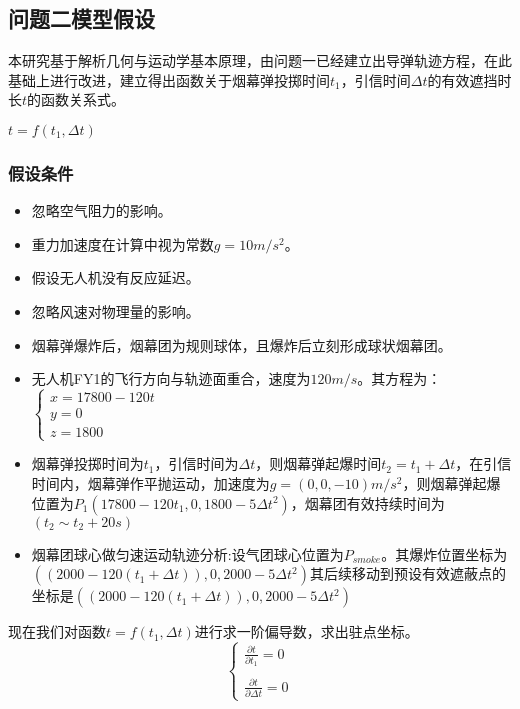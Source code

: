 \documentclass{article}
\begin{document}
\subsection{问题二模型假设}
本研究基于解析几何与运动学基本原理，由问题一已经建立出导弹轨迹方程，在此基础上进行改进，建立得出函数关于烟幕弹投掷时间$t_1$，引信时间$\Delta t$的有效遮挡时长$t$的函数关系式。

$t = f(t_1 , \Delta t)$

\subsubsection{假设条件}
\begin{itemize}
    \item 忽略空气阻力的影响。
    \item 重力加速度在计算中视为常数$g = 10m/s^2$。
    \item 假设无人机没有反应延迟。
    \item 忽略风速对物理量的影响。
    \item 烟幕弹爆炸后，烟幕团为规则球体，且爆炸后立刻形成球状烟幕团。
\end{itemize}

\begin{itemize}
    \item 无人机FY1的飞行方向与轨迹面重合，速度为$120m/s$。其方程为：$\begin{cases}
        x = 17800 - 120t \\
        y = 0 \\
        z = 1800
    \end{cases}$
    \item 烟幕弹投掷时间为$t_1$，引信时间为$\Delta t$，则烟幕弹起爆时间$t_2 = t_1 + \Delta t$，在引信时间内，烟幕弹作平抛运动，加速度为$g = (0,0,-10)$$m/s^2$，则烟幕弹起爆位置为$P_1(17800 - 120t_1,0,1800 - 5\Delta t^2)$，烟幕团有效持续时间为$(t_2 \sim t_2 + 20s)$
    \item 烟幕团球心做匀速运动轨迹分析:设气团球心位置为$P_{smoke}$。其爆炸位置坐标为$((2000-120(t_1 + \Delta t)),0,2000-5 \Delta t^2)$其后续移动到预设有效遮蔽点的坐标是$((2000-120(t_1 + \Delta t)),0,2000-5 \Delta t^2)$

\end{itemize}
现在我们对函数$t = f(t_1 , \Delta t)$进行求一阶偏导数，求出驻点坐标。
\[
\begin{cases}
\frac{\partial t}{\partial t_1} = 0 \\\\
\frac{\partial t}{\partial \Delta t} = 0
\end{cases}
\]
\end{document}

